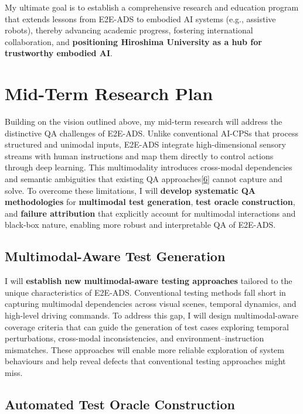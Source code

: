 \documentclass[12pt,a4paper]{article}
\begin{document}
My ultimate goal is to establish a comprehensive research and education program that extends lessons from E2E-ADS to embodied AI systems (e.g., assistive robots), thereby advancing academic progress, fostering international collaboration, and \textbf{positioning Hiroshima University as a hub for trustworthy embodied AI}.

\section{Mid-Term Research Plan}

Building on the vision outlined above, my mid-term research will address the distinctive QA challenges of E2E-ADS. Unlike conventional AI-CPSs that process structured and unimodal inputs, E2E-ADS integrate high-dimensional sensory streams with human instructions and map them directly to control actions through deep learning. This multimodality introduces cross-modal dependencies and semantic ambiguities that existing QA approaches\hyperlink{paper6}{[6]} cannot capture and solve. To overcome these limitations, I will \textbf{develop systematic QA methodologies} for \textbf{multimodal test generation}, \textbf{test oracle construction}, and \textbf{failure attribution} that explicitly account for multimodal interactions and black-box nature, enabling more robust and interpretable QA of E2E-ADS.

\subsection{Multimodal-Aware Test Generation}

I will \textbf{establish new multimodal-aware testing approaches} tailored to the unique characteristics of E2E-ADS. Conventional testing methods fall short in capturing multimodal dependencies across visual scenes, temporal dynamics, and high-level driving commands. To address this gap, I will design multimodal-aware coverage criteria that can guide the generation of test cases exploring temporal perturbations, cross-modal inconsistencies, and environment–instruction mismatches. These approaches will enable more reliable exploration of system behaviours and help reveal defects that conventional testing approaches might miss.

\subsection{Automated Test Oracle Construction}
\end{document}
